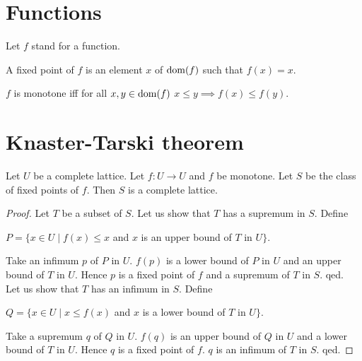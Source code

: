 \documentclass{article}
\begin{document}
  \section{Functions}

  \begin{forthel}

    Let $f$ stand for a function.

    \begin{definition}
      A fixed point of $f$ is an element $x$ of $\operatorname{dom}(f)$ such that $f(x) = x$.
    \end{definition}

    \begin{definition}
      $f$ is monotone iff for all $x,y \in \operatorname{dom}(f)$ $x \leq y \implies f(x) \leq f(y)$.
    \end{definition}
  \end{forthel}

  \section{Knaster-Tarski theorem}

  \begin{forthel}

    \begin{theorem}[KnasterTarski]
      Let $U$ be a complete lattice. Let $f:U \rightarrow U$ and $f$ be monotone.
      Let $S$ be the class of fixed points of $f$. Then $S$ is a complete lattice.
    \end{theorem}
    \begin{proof}
      Let $T$ be a subset of $S$.
      Let us show that $T$ has a supremum in $S$.  Define 
        
        $  P = \{x \in U \mid f(x) \leq x$ and $x$ is an upper bound of $T$ in $U\}$.

        Take an infimum $p$ of $P$ in $U$. $f(p)$ is a lower bound of $P$ in $U$ and an upper bound of $T$ in $U$.
        Hence $p$ is a fixed point of $f$ and a supremum of $T$ in $S$.
      qed. \\
      Let us show that $T$ has an infimum in $S$. Define 
        
        $  Q = \{x \in U \mid x \leq f(x)$ and $x$ is a lower bound of $T$ in $U\}$.

        Take a supremum $q$ of $Q$ in $U$. $f(q)$ is an upper bound of $Q$ in $U$ and a lower bound of $T$ in $U$.
        Hence $q$ is a fixed point of $f$. $q$ is an infimum of $T$ in $S$.
      qed.
    \end{proof}
  \end{forthel}
\end{document}
